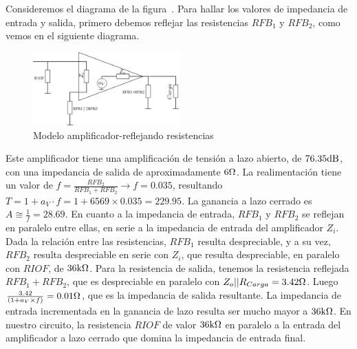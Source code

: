 Consideremos el diagrama de la figura~. Para hallar los valores de impedancia de entrada y salida, primero debemos reflejar las resistencias $RFB_{1}$ y $RFB_{2}$, como vemos en el siguiente diagrama.

\begin{figure}[H]
	\centering
	\includegraphics[width=0.5\textwidth]{img/reflejo.png}
	\caption{Modelo amplificador-reflejando resistencias}
	\label{fig:ampli_realimentacion}
\end{figure}


\begin{sloppypar}

Este amplificador tiene una amplificación de tensión a lazo abierto, de $76.35 \si[per-mode=symbol]{\decibel}$, con una impedancia de salida de aproximadamente $6 \si[per-mode=symbol]{\ohm}$.
La realimentación tiene un valor de ${ f = \frac{RFB_{2}}{RFB_{1} + RFB_{2}} \rightarrow f = 0.035 }$, resultando ${T = 1 + a_{V} \cdot f = 1 + 6569 \times 0.035 = 229.95}$. La ganancia a lazo cerrado es ${ A \cong \frac{1}{f} = 28.69 }$. En cuanto a la impedancia de entrada, $RFB_{1}$ y $RFB_{2}$ se reflejan en paralelo entre ellas, en serie a la impedancia de entrada del amplificador $Z_i$. Dada la relación entre las resistencias, $RFB_{1}$ resulta despreciable, y a su vez, $RFB_{2}$ resulta despreciable en serie con $Z_i$, que resulta despreciable, en paralelo con $RIOF$, de $36 \si[per-mode=symbol]{\kilo\ohm}$. Para la resistencia de salida, tenemos la resistencia reflejada $RFB_{1} + RFB_{2}$, que es despreciable en paralelo con $Z_o || R_{Carga} = 3.42 \si[per-mode=symbol]{\ohm}$. Luego ${ \frac{3.42}{(1 + a_{V} \times f)} = 0.01 \si[per-mode=symbol]{\ohm} }$, que es la impedancia de salida resultante. La impedancia de entrada incrementada en la ganancia de lazo resulta ser mucho mayor a $36 \si[per-mode=symbol]{\kilo\ohm}$. En nuestro circuito, la resistencia $RIOF$ de valor $36 \si[per-mode=symbol]{\kilo\ohm}$ en paralelo a la entrada del amplificador a lazo cerrado que domina la impedancia de entrada final.

\end{sloppypar}



